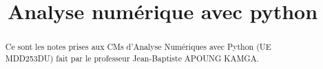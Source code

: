 \documentclass[a4paper]{report}
\title{Analyse numérique avec python}
\begin{document}
\maketitle
\begin{abstract}
   Ce sont les notes prises aux CMs d'Analyse Numériques avec Python (UE MDD253DU) fait par le professeur Jean-Baptiste APOUNG KAMGA.
\end{abstract}
\tableofcontents







\end{document}
